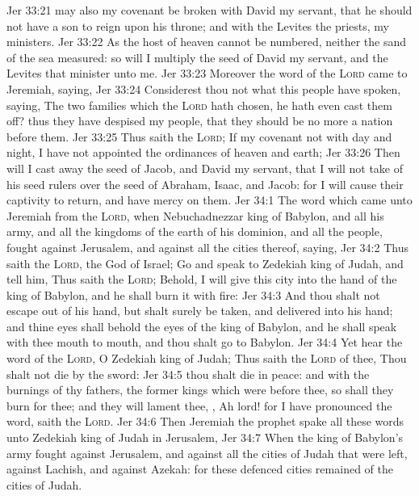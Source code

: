 \vs Jer 33:21  may also my covenant be broken with David my servant, that he should not have a son to reign upon his throne; and with the Levites the priests, my ministers.
\vs Jer 33:22 As the host of heaven cannot be numbered, neither the sand of the sea measured: so will I multiply the seed of David my servant, and the Levites that minister unto me.
\vs Jer 33:23 Moreover the word of the \textsc{Lord} came to Jeremiah, saying,
\vs Jer 33:24 Considerest thou not what this people have spoken, saying, The two families which the \textsc{Lord} hath chosen, he hath even cast them off? thus they have despised my people, that they should be no more a nation before them.
\vs Jer 33:25 Thus saith the \textsc{Lord}; If my covenant  not with day and night,  I have not appointed the ordinances of heaven and earth;
\vs Jer 33:26 Then will I cast away the seed of Jacob, and David my servant,  that I will not take  of his seed  rulers over the seed of Abraham, Isaac, and Jacob: for I will cause their captivity to return, and have mercy on them.
\vs Jer 34:1 The word which came unto Jeremiah from the \textsc{Lord}, when Nebuchadnezzar king of Babylon, and all his army, and all the kingdoms of the earth of his dominion, and all the people, fought against Jerusalem, and against all the cities thereof, saying,
\vs Jer 34:2 Thus saith the \textsc{Lord}, the God of Israel; Go and speak to Zedekiah king of Judah, and tell him, Thus saith the \textsc{Lord}; Behold, I will give this city into the hand of the king of Babylon, and he shall burn it with fire:
\vs Jer 34:3 And thou shalt not escape out of his hand, but shalt surely be taken, and delivered into his hand; and thine eyes shall behold the eyes of the king of Babylon, and he shall speak with thee mouth to mouth, and thou shalt go to Babylon.
\vs Jer 34:4 Yet hear the word of the \textsc{Lord}, O Zedekiah king of Judah; Thus saith the \textsc{Lord} of thee, Thou shalt not die by the sword:
\vs Jer 34:5  thou shalt die in peace: and with the burnings of thy fathers, the former kings which were before thee, so shall they burn  for thee; and they will lament thee, , Ah lord! for I have pronounced the word, saith the \textsc{Lord}.
\vs Jer 34:6 Then Jeremiah the prophet spake all these words unto Zedekiah king of Judah in Jerusalem,
\vs Jer 34:7 When the king of Babylon's army fought against Jerusalem, and against all the cities of Judah that were left, against Lachish, and against Azekah: for these defenced cities remained of the cities of Judah.
